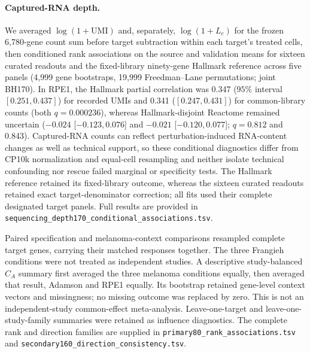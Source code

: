 \documentclass[a4paper,fleqn]{cas-sc}
\makeatletter
\DeclareRobustCommand{\rev}[1]{{\color{red}\def\@citecolor{black}\def\@linkcolor{red}\def\@urlcolor{red}#1}}
\makeatother
\begin{document}
\paragraph{\rev{Captured-RNA depth.}}
\rev{We averaged $\log(1+\mathrm{UMI})$ and, separately, $\log(1+L_c)$ for the frozen 6,780-gene count sum before target subtraction within each target's treated cells, then conditioned rank associations on the source and validation means for sixteen curated readouts and the fixed-library ninety-gene Hallmark reference across five panels (4,999 gene bootstraps, 19,999 Freedman--Lane permutations; joint BH170).} \rev{In RPE1, the Hallmark partial correlation was 0.347 ($95\%$ interval $[0.251,0.437]$) for recorded UMIs and 0.341 ($[0.247,0.431]$) for common-library counts (both $q=0.000236$), whereas Hallmark-disjoint Reactome remained uncertain ($-0.024$ [$-0.123,0.076$] and $-0.021$ [$-0.120,0.077$]; $q=0.812$ and 0.843).} \rev{Captured-RNA counts can reflect perturbation-induced RNA-content changes as well as technical support, so these conditional diagnostics differ from CP10k normalization and equal-cell resampling and neither isolate technical confounding nor rescue failed marginal or specificity tests.}
 \rev{The Hallmark reference retained its fixed-library outcome, whereas the sixteen curated readouts retained exact target-denominator correction; all fits used their complete designated target panels.} \rev{Full results are provided in \nolinkurl{sequencing_depth170_conditional_associations.tsv}.}

\rev{Paired specification and melanoma-context comparisons resampled complete target genes, carrying their matched responses together.} \rev{The three Frangieh conditions were not treated as independent studies.} \rev{A descriptive study-balanced $C_A$ summary first averaged the three melanoma conditions equally, then averaged that result, Adamson and RPE1 equally.} \rev{Its bootstrap retained gene-level context vectors and missingness; no missing outcome was replaced by zero.} \rev{This is not an independent-study common-effect meta-analysis.} \rev{Leave-one-target and leave-one-study-family summaries were retained as influence diagnostics.} \rev{The complete rank and direction families are supplied in \nolinkurl{primary80_rank_associations.tsv} and \nolinkurl{secondary160_direction_consistency.tsv}.}
\end{document}

